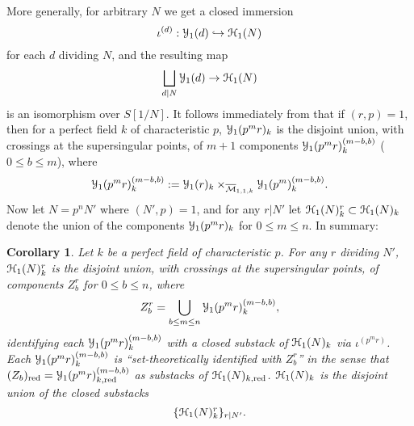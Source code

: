 \documentclass[11pt]{amsart}
\newtheorem{corollary}[subsection]{Corollary}
\theoremstyle{definition}
\begin{document}
More generally, for arbitrary $N$ we get a closed immersion
\begin{displaymath}
\iota^{(d)}:{\mathbf{\EuScript{Y}}}_1(d)\hookrightarrow {\mathbf{\EuScript{H}}}_1(N)
\end{displaymath}
for each $d$ dividing $N$, and the resulting map 
\begin{displaymath}
\bigsqcup_{d|N} {\mathbf{\EuScript{Y}}}_1(d) \rightarrow {\mathbf{\EuScript{H}}}_1(N)
\end{displaymath}
is an isomorphism over $S[1/N]$. It follows immediately from \cite[\S13.5]{KM1} that if $(r,p) = 1$, then for a perfect field $k$ of characteristic $p$, ${\mathbf{\EuScript{Y}}}_1(p^mr)_k$ is the disjoint union, with crossings at the supersingular points, of $m+1$ components ${\mathbf{\EuScript{Y}}}_1(p^mr)_k^{(m-b,b)}$ ($0\leq b \leq m$), where 
\begin{displaymath}
{\mathbf{\EuScript{Y}}}_1(p^mr)_k^{(m-b,b)} := {\mathbf{\EuScript{Y}}}_1(r)_k \times_{\overline{\mathcal{M}}_{1,1,k}} {\mathbf{\EuScript{Y}}}_1(p^m)^{(m-b,b)}_k. 
\end{displaymath}
Now let $N = p^nN'$ where $(N',p) = 1$, and for any $r|N'$ let ${\mathbf{\EuScript{H}}}_1(N)^r_k \subset {\mathbf{\EuScript{H}}}_1(N)_k$ denote the union of the components ${\mathbf{\EuScript{Y}}}_1(p^mr)_k$ for $0\leq m \leq n$. In summary:
\begin{corollary}
Let $k$ be a perfect field of characteristic $p$. For any $r$ dividing $N'$, ${\mathbf{\EuScript{H}}}_1(N)^r_k$ is the disjoint union, with crossings at the supersingular points, of components $Z^r_b$ for $0 \leq b \leq n$, where 
\begin{displaymath}
Z_b^r = \bigcup_{b\leq m \leq n} {\mathbf{\EuScript{Y}}}_1(p^mr)^{(m-b,b)}_k,
\end{displaymath}
identifying each ${\mathbf{\EuScript{Y}}}_1(p^mr)^{(m-b,b)}_k$ with a closed substack of ${\mathbf{\EuScript{H}}}_1(N)_k$ via $\iota^{(p^mr)}$. Each ${\mathbf{\EuScript{Y}}}_1(p^mr)^{(m-b,b)}_k$ is ``set-theoretically identified with $Z_b^r$'' in the sense that $(Z_b)_{\mathrm{red}} = {\mathbf{\EuScript{Y}}}_1(p^mr)^{(m-b,b)}_{k,\mathrm{red}}$ as substacks of ${\mathbf{\EuScript{H}}}_1(N)_{k,\mathrm{red}}$. ${\mathbf{\EuScript{H}}}_1(N)_k$ is the disjoint union of the closed substacks 
\begin{displaymath}
\{{\mathbf{\EuScript{H}}}_1(N)^r_k\}_{r|N'}.
\end{displaymath}
\end{corollary}
\end{document}
